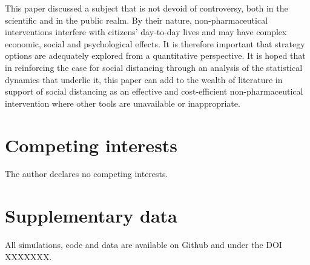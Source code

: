 \documentclass{article}
\begin{document}
This paper discussed a subject that is not devoid of controversy, both in the scientific and in the public realm. By their nature, non-pharmaceutical interventions interfere with citizens' day-to-day lives and may have complex economic, social and psychological effects. It is therefore important that strategy options are adequately explored from a quantitative perspective. It is hoped that in reinforcing the case for social distancing through an analysis of the statistical dynamics that underlie it, this paper can add to the wealth of literature in support of social distancing as an effective and cost-efficient non-pharmaceutical intervention where other tools are unavailable or inappropriate.


\section*{Competing interests} %
\label{sec:competing_interests}

The author declares no competing interests.


\section*{Supplementary data} %
\label{sec:supplementary_data}

All simulations, code and data are available on Github and under the DOI XXXXXXX.



\end{document}

